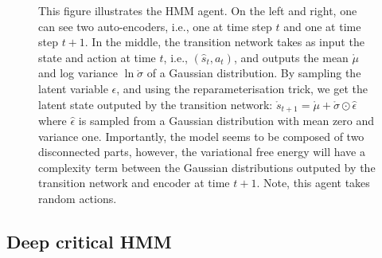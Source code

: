 \documentclass[twoside,11pt]{article}
\begin{document}
\begin{figure}[h]
	\begin{center}
	\end{center}
	\caption{This figure illustrates the HMM agent. On the left and right, one can see two auto-encoders, i.e., one at time step $t$ and one at time step $t+1$. In the middle, the transition network takes as input the state and action at time $t$, i.e., $(\hat{s}_t, a_t)$, and outputs the mean $\mathring{\mu}$ and log variance $\ln\mathring{\sigma}$ of a Gaussian distribution. By sampling the latent variable $\epsilon$, and using the reparameterisation trick, we get the latent state outputed by the transition network: $\mathring{s}_{t+1} = \mathring{\mu} + \mathring{\sigma} \odot \hat{\epsilon}$ where $\hat{\epsilon}$ is sampled from a Gaussian distribution with mean zero and variance one. Importantly, the model seems to be composed of two disconnected parts, however, the variational free energy will have a complexity term between the Gaussian distributions outputed by the transition network and encoder at time $t+1$. Note, this agent takes random actions.}
   \label{fig:HMM}
\end{figure}

\subsection{Deep critical HMM} \label{ssec:CHMM}
\end{document}
